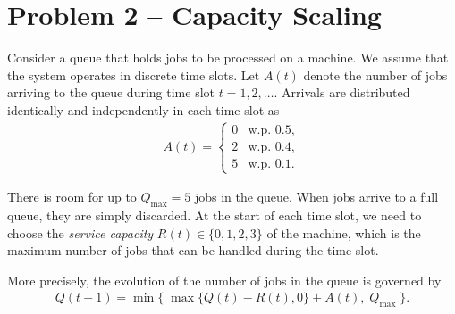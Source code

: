 \documentclass{article}
\begin{document}
\section*{Problem 2 -- Capacity Scaling}

Consider a queue that holds jobs to be processed on a machine.
We assume that the system operates in discrete time slots.
Let $A(t)$ denote the number of jobs arriving to the queue during time slot $t = 1, 2, \dots$.
Arrivals are distributed identically and independently in each time slot as
\begin{align*}
    A(t) = \begin{cases}
        0 & \text{w.p. } 0.5, \\
        2 & \text{w.p. } 0.4, \\
        5 & \text{w.p. } 0.1.
    \end{cases}
\end{align*}


\noindent
There is room for up to $Q_\text{max}=5$ jobs in the queue.
When jobs arrive to a full queue, they are simply discarded.
At the start of each time slot, we need to choose the \textit{service capacity} $R(t) \in \{ 0, 1, 2, 3 \}$ of the machine, which is the maximum number of jobs that can be handled during the time slot.

\begin{figure}[h!]
    \centering
{}
\label{queue}
\end{figure}
\vspace{0.5em}

\noindent
More precisely, the evolution of the number of jobs in the queue is governed by
\begin{align*}
    Q(t + 1) = \min\{ \; \max \{ Q(t) - R(t), 0 \} + A(t) , \; Q_\text{max} \; \} .
\end{align*}
\end{document}
